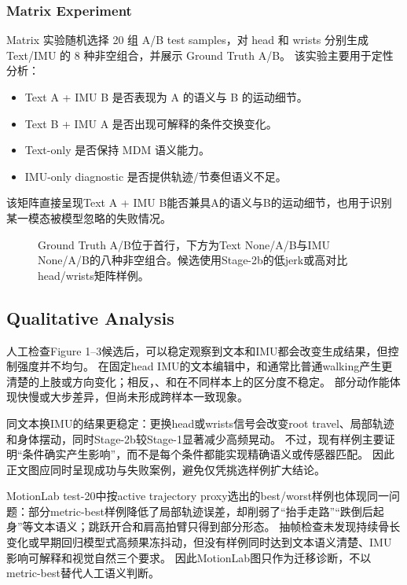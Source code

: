 \subsubsection{Matrix Experiment}

Matrix 实验随机选择 20 组 A/B test samples，对 head 和 wrists 分别生成 Text/IMU 的 8 种非空组合，并展示 Ground Truth A/B。
该实验主要用于定性分析：

\begin{itemize}
\item Text A + IMU B 是否表现为 A 的语义与 B 的运动细节。
\item Text B + IMU A 是否出现可解释的条件交换变化。
\item Text-only 是否保持 MDM 语义能力。
\item IMU-only diagnostic 是否提供轨迹/节奏但语义不足。
\end{itemize}

该矩阵直接呈现Text A + IMU B能否兼具A的语义与B的运动细节，也用于识别某一模态被模型忽略的失败情况。

\begin{figure}[t]
\centering
{}
\caption{Ground Truth A/B位于首行，下方为Text None/A/B与IMU None/A/B的八种非空组合。候选使用Stage-2b的低jerk或高对比head/wrists矩阵样例。}
\label{fig:qualitative-3}
\end{figure}

\subsection{Qualitative Analysis}

人工检查Figure 1--3候选后，可以稳定观察到文本和IMU都会改变生成结果，但控制强度并不均匀。
在固定head IMU的文本编辑中，\texttt{}和\texttt{}通常比普通walking产生更清楚的上肢或方向变化；相反，\texttt{}、\texttt{}和\texttt{}在不同样本上的区分度不稳定。
部分动作能体现快慢或大步差异，但尚未形成跨样本一致现象。

同文本换IMU的结果更稳定：更换head或wrists信号会改变root travel、局部轨迹和身体摆动，同时Stage-2b较Stage-1显著减少高频晃动。
不过，现有样例主要证明“条件确实产生影响”，而不是每个条件都能实现精确语义或传感器匹配。
因此正文图应同时呈现成功与失败案例，避免仅凭挑选样例扩大结论。

MotionLab \cite{guo2025motionlab} test-20中按active trajectory proxy选出的best/worst样例也体现同一问题：部分metric-best样例降低了局部轨迹误差，却削弱了“抬手走路”“跌倒后起身”等文本语义；跳跃开合和肩高拍臂只得到部分形态。
抽帧检查未发现持续骨长变化或早期回归模型式高频果冻抖动，但没有样例同时达到文本语义清楚、IMU影响可解释和视觉自然三个要求。
因此MotionLab图只作为迁移诊断，不以metric-best替代人工语义判断。

